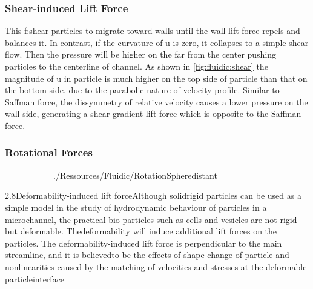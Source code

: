 \subsubsection{Shear-induced Lift Force}
This \gls{f:shear} particles to migrate toward walls until the wall lift force repels and balances it. In contrast, if the curvature of \gls{u} is zero, it collapses to a simple shear flow. Then the pressure will be higher on the far from the center pushing particles to the centerline of channel. As shown in \ref{fig:fluidic:shear} the magnitude of \gls{u} in particle is much higher on the top side of particle  than  that  on  the  bottom  side,  due  to  the parabolic nature of velocity profile. Similar  to  Saffman  force,  the  dissymmetry  of  relative  velocity  causes  a  lower  pressure  on the wall side, generating a shear gradient lift force which is opposite to the Saffman force. \cite{lit:fluidic:inertialFluidicsForces} 


\subsubsection{Rotational Forces}

\begin{figure}[!htb]
	\begin{subfigure}[b]{0.66\textwidth}
		\centering
		\addtocounter{subfigure}{1}  
		 {./Ressources/Fluidic/RotationSpheredistant}		
		\addtocounter{subfigure}{-1}  
		\label{fig:fluidic:particleRotationfar}
	\end{subfigure}%
	\begin{subfigure}[b]{0.33\textwidth}
		\centering
		\addtocounter{subfigure}{1}  
		\addtocounter{subfigure}{-1}  
		\label{fig:fluidic:particleRotationnear}
	\end{subfigure}
	\label{fig:fluidic:particleRotation}
\end{figure}




2.8Deformability-induced lift forceAlthough solidrigid  particles  can  be  used  as  a  simple  model  in  the  study  of  hydrodynamic behaviour of particles in a microchannel, the practical bio-particles such as cells and vesicles are  not  rigid  but  deformable. Thedeformability  will  induce  additional  lift  forces on  the particles. The deformability-induced lift force is perpendicular to the main streamline, and it is believedto  be  the  effects  of  shape-change  of  particle  and  nonlinearities  caused  by  the matching   of   velocities   and   stresses   at   the   deformable   particleinterface 

